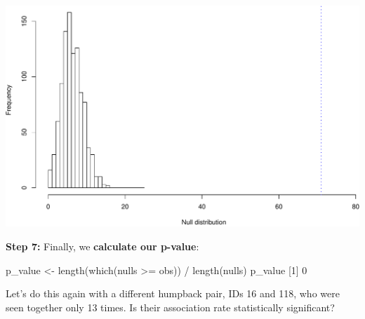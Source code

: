 \documentclass[
]{book}
\newenvironment{Shaded}{\begin{snugshade}}{\end{snugshade}}
\newcommand{\DecValTok}[1]{\textcolor[rgb]{0.00,0.00,0.81}{#1}}
\newcommand{\FunctionTok}[1]{\textcolor[rgb]{0.00,0.00,0.00}{#1}}
\newcommand{\NormalTok}[1]{#1}
\newcommand{\OtherTok}[1]{\textcolor[rgb]{0.56,0.35,0.01}{#1}}
\newcommand{\SpecialCharTok}[1]{\textcolor[rgb]{0.00,0.00,0.00}{#1}}
\begin{document}
\includegraphics{figures/unnamed-chunk-409-1.pdf}

\textbf{Step 7:} Finally, we \textbf{calculate our p-value}:

\begin{Shaded}
\begin{Highlighting}[]
\NormalTok{p\_value }\OtherTok{\textless{}{-}} \FunctionTok{length}\NormalTok{(}\FunctionTok{which}\NormalTok{(nulls }\SpecialCharTok{\textgreater{}=}\NormalTok{ obs)) }\SpecialCharTok{/} \FunctionTok{length}\NormalTok{(nulls)}
\NormalTok{p\_value}
\NormalTok{[}\DecValTok{1}\NormalTok{] }\DecValTok{0}
\end{Highlighting}
\end{Shaded}

Let's do this again with a different humpback pair, IDs 16 and 118, who were seen together only 13 times. Is their association rate statistically significant?
\end{document}
